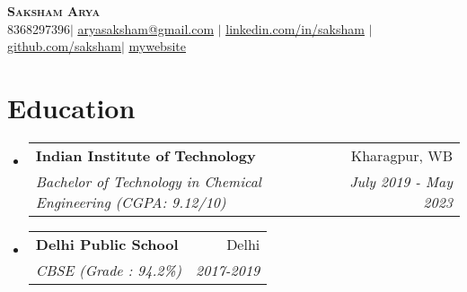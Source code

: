\documentclass[letterpaper,11pt]{article}
\makeatletter
\newcommand{\resumeItem}[1]{
  \item\small{
    {#1 \vspace{-2pt}}
  }
}
\newcommand{\resumeSubheading}[4]{
  \vspace{-2pt}\item
    \begin{tabular*}{0.97\textwidth}[t]{l@{\extracolsep{\fill}}r}
      \textbf{#1} & #2 \\
      \textit{\small#3} & \textit{\small #4} \\
    \end{tabular*}\vspace{-7pt}
}
\newcommand{\resumeSubHeadingListStart}{\begin{itemize}[leftmargin=0.15in, label={}]}
\newcommand{\resumeSubHeadingListEnd}{\end{itemize}}
\newcommand{\resumeItemListStart}{\begin{itemize}}
\newcommand{\resumeItemListEnd}{\end{itemize}\vspace{-5pt}}
\makeatother
\begin{document}

\begin{center}
    \textbf{\Huge \scshape Saksham Arya} \\ \vspace{1pt}
    \small 8368297396$|$ \href{mailto:aryasaksham@gmail.com}{\underline{aryasaksham@gmail.com}} $|$ 
    \href{https://www.linkedin.com/in/saksham-arya-7561861a3/}{\underline{linkedin.com/in/saksham}} $|$
    \href{https://github.com/sAksham-Ar}{\underline{github.com/saksham}}$|$
    \href{https://saksham-ar.github.io/}{\underline{mywebsite}}
\end{center}


\section{Education}
  \resumeSubHeadingListStart
    \resumeSubheading
      {Indian Institute of Technology}{Kharagpur, WB}
      {Bachelor of Technology in Chemical Engineering (CGPA: 9.12/10)}{July 2019 - May 2023}
    \resumeSubheading
      {Delhi Public School}{Delhi}
      {CBSE (Grade : 94.2\%)}{2017-2019}
  \resumeSubHeadingListEnd



      
\end{document}
